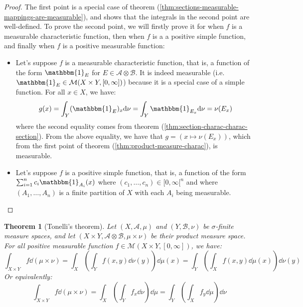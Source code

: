 \documentclass{article}
\newtheorem{theorem}{Theorem}[section]
\theoremstyle{definition}
\theoremstyle{remark}
\theoremstyle{example}
\theoremstyle{notation}
\begin{document}
\begin{proof}
		The first point is a special case of theorem (\ref{thm:sections-measurable-mappings-are-measurable}), and shows that the integrals in the second point are well-defined. To prove the second point, we will firstly prove it for when $f$ is a measurable characteristic function, then when $f$ is a a positive simple function, and finally when $f$ is a positive measurable function:
		\begin{itemize}
				\item Let's suppose $f$ is a measurable characteristic function, that is, a function of the form $\mathbbm{1}_{E}$ for $E \in \mathcal{A} \otimes \mathcal{B}$. It is indeed measurable (i.e. $\mathbbm{1}_E \in \mathcal{M}(X \times Y, [0, \infty])$) because it is a special case of a simple function. For all $x \in X$, we have:
						$$g(x) = \int_Y (\mathbbm{1}_E)_x \dd \nu = \int_Y \mathbbm{1}_{E_x} \dd \nu = \nu(E_x)$$
				where the second equality comes from theorem (\ref{thm:section-charac-charac-section}). From the above equality, we have that $g = (x \mapsto \nu(E_x))$, which from the first point of theorem (\ref{thm:product-measure-charac}), is measurable.
		\item Let's suppose $f$ is a positive simple function, that is, a function of the form $\sum_{i=1}^n c_i \mathbbm{1}_{A_i}(x)$ where $(c_1, \dots, c_n) \in [0, \infty[^n$ and where $(A_1, \dots, A_n)$ is a finite partition of $X$ with each $A_i$ being measurable.
		\end{itemize}
\end{proof}


\begin{theorem}[Tonelli's theorem]
		Let $(X, \mathcal{A}, \mu)$ and $(Y, \mathcal{B}, \nu)$ be $\sigma$-finite measure spaces, and let $(X \times Y, \mathcal{A} \otimes \mathcal{B}, \mu \times \nu)$ be their product measure space. For all positive measurable function $f \in \mathcal{M}(X \times Y, [0, \infty])$, we have:
				$$\int_{X \times Y} f \dd (\mu \times \nu) = \int_X \left(\int_Y f(x, y) \dd \nu(y)\right) \dd \mu(x) = \int_Y \left(\int_X f(x, y) \dd \mu(x)\right) \dd \nu(y)$$
		Or equivalently:
				$$\int_{X \times Y} f \dd (\mu \times \nu) = \int_X \left(\int_Y f_x \dd \nu\right) \dd \mu = \int_Y \left(\int_X f_y \dd \mu\right) \dd \nu$$
\end{theorem} %
\end{document}
